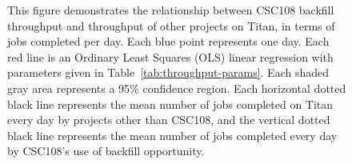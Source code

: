 \begin{figure}
  \vspace{1em}
  \caption{This figure demonstrates the relationship between CSC108 backfill
throughput and throughput of other projects on Titan, in terms of jobs
completed per day. Each blue point represents one day. Each red line is an
Ordinary Least Squares (OLS) linear regression with parameters given in
Table~\ref{tab:throughput-params}. Each shaded gray area represents a 95\%
confidence region. Each horizontal dotted black line represents the mean number
of jobs completed on Titan every day by projects other than CSC108, and the
vertical dotted black line represents the mean number of jobs completed every
day by CSC108's use of backfill opportunity.}
\end{figure}


